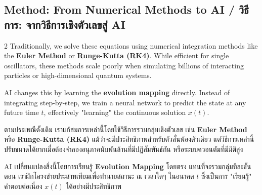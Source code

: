 \subsection{Method: From Numerical Methods to AI \quad / \quad \textthai{วิธีการ: จากวิธีการเชิงตัวเลขสู่ AI}}
\begin{paracol}{2}
Traditionally, we solve these equations using numerical integration methods like the \textbf{Euler Method} or \textbf{Runge-Kutta (RK4)}. While efficient for single oscillators, these methods scale poorly when simulating billions of interacting particles or high-dimensional quantum systems.

AI changes this by learning the \textbf{evolution mapping} directly. Instead of integrating step-by-step, we train a neural network to predict the state at any future time $t$, effectively "learning" the continuous solution $x(t)$.

\switchcolumn

\begin{thai}
ตามประเพณีดั้งเดิม เราแก้สมการเหล่านี้โดยใช้วิธีการรวมกลุ่มเชิงตัวเลข เช่น \textbf{Euler Method} หรือ \textbf{Runge-Kutta (RK4)} แม้ว่าจะมีประสิทธิภาพสำหรับตัวสั่นพ้องตัวเดียว แต่วิธีการเหล่านี้ปรับขนาดได้ยากเมื่อต้องจำลองอนุภาคนับพันล้านที่มีปฏิสัมพันธ์กัน หรือระบบควอนตัมที่มีมิติสูง

AI เปลี่ยนแปลงสิ่งนี้โดยการเรียนรู้ \textbf{Evolution Mapping} โดยตรง แทนที่จะรวมกลุ่มทีละขั้นตอน เราฝึกโครงข่ายประสาทเทียมเพื่อทำนายสถานะ ณ เวลาใดๆ ในอนาคต $t$ ซึ่งเป็นการ "เรียนรู้" คำตอบต่อเนื่อง $x(t)$ ได้อย่างมีประสิทธิภาพ
\end{thai}
\end{paracol}

